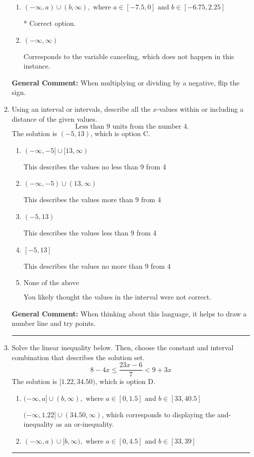 \documentclass{extbook}[14pt]
\newcommand{\litem}[1]{\item #1

\rule{\textwidth}{0.4pt}}
\begin{document}
\begin{enumerate}
{\begin{enumerate}[label=\Alph*.]
Corresponds to inverting the inequality and negating the solution.
\item \( (-\infty, a) \cup (b, \infty), \text{ where } a \in [-7.5, 0] \text{ and } b \in [-6.75, 2.25] \)

 * Correct option.
\item \( (-\infty, \infty) \)

Corresponds to the variable canceling, which does not happen in this instance.
\end{enumerate}

\textbf{General Comment:} When multiplying or dividing by a negative, flip the sign.
}
\litem{
Using an interval or intervals, describe all the $x$-values within or including a distance of the given values.
\[ \text{ Less than } 9 \text{ units from the number } 4. \]The solution is \( (-5, 13) \), which is option C.\begin{enumerate}[label=\Alph*.]
\item \( (-\infty, -5] \cup [13, \infty) \)

This describes the values no less than 9 from 4
\item \( (-\infty, -5) \cup (13, \infty) \)

This describes the values more than 9 from 4
\item \( (-5, 13) \)

This describes the values less than 9 from 4
\item \( [-5, 13] \)

This describes the values no more than 9 from 4
\item \( \text{None of the above} \)

You likely thought the values in the interval were not correct.
\end{enumerate}

\textbf{General Comment:} When thinking about this language, it helps to draw a number line and try points.
}
\litem{
Solve the linear inequality below. Then, choose the constant and interval combination that describes the solution set.
\[ 8 - 4 x \leq \frac{23 x - 6}{7} < 9 + 3 x \]The solution is \( [1.22, 34.50) \), which is option D.\begin{enumerate}[label=\Alph*.]
\item \( (-\infty, a] \cup (b, \infty), \text{ where } a \in [0, 1.5] \text{ and } b \in [33, 40.5] \)

$(-\infty, 1.22] \cup (34.50, \infty)$, which corresponds to displaying the and-inequality as an or-inequality.
\item \( (-\infty, a) \cup [b, \infty), \text{ where } a \in [0, 4.5] \text{ and } b \in [33, 39] \)


\end{enumerate}}
\end{enumerate}
\end{document}
